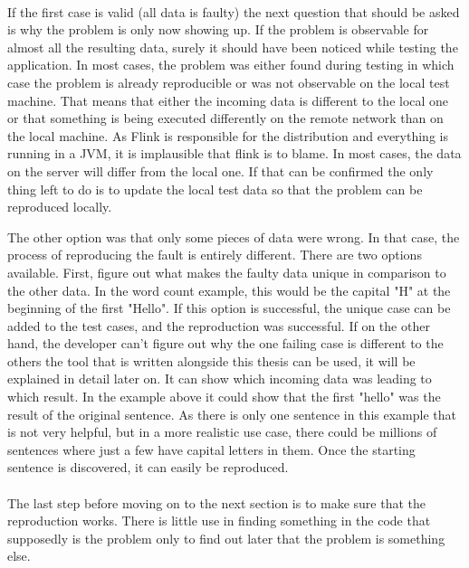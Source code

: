 \paragraph{} If the first case is valid (all data is faulty) the next question that should be asked is why the problem is only now showing up. If the problem is observable for almost all the resulting data, surely it should have been noticed while testing the application. In most cases, the problem was either found during testing in which case the problem is already reproducible or was not observable on the local test machine. That means that either the incoming data is different to the local one or that something is being executed differently on the remote network than on the local machine. As Flink is responsible for the distribution and everything is running in a JVM, it is implausible that flink is to blame. In most cases, the data on the server will differ from the local one. If that can be confirmed the only thing left to do is to update the local test data so that the problem can be reproduced locally.

The other option was that only some pieces of data were wrong. In that case, the process of reproducing the fault is entirely different. There are two options available. First, figure out what makes the faulty data unique in comparison to the other data. In the word count example, this would be the capital "H" at the beginning of the first "Hello". If this option is successful, the unique case can be added to the test cases, and the reproduction was successful. If on the other hand, the developer can't figure out why the one failing case is different to the others the tool that is written alongside this thesis can be used, it will be explained in detail later on. It can show which incoming data was leading to which result. In the example above it could show that the first "hello" was the result of the original sentence. As there is only one sentence in this example that is not very helpful, but in a more realistic use case, there could be millions of sentences where just a few have capital letters in them. Once the starting sentence is discovered, it can easily be reproduced.

\paragraph{} The last step before moving on to the next section is to make sure that the reproduction works. There is little use in finding something in the code that supposedly is the problem only to find out later that the problem is something else.

